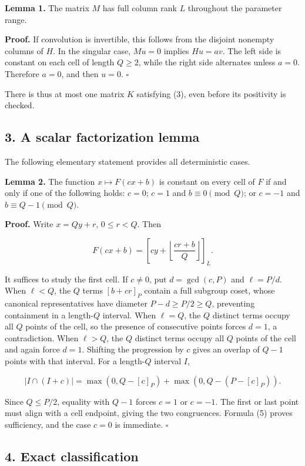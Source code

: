 \documentclass[
]{article}
\begin{document}
\textbf{Lemma 1.} The matrix \(M\) has full column rank \(L\) throughout
the parameter range.

\textbf{Proof.} If convolution is invertible, this follows from the
disjoint nonempty columns of \(H\). In the singular case, \(Mu=0\)
implies \(Hu=av\). The left side is constant on each cell of length
\(Q\ge2\), while the right side alternates unless \(a=0\). Therefore
\(a=0\), and then \(u=0\). \(\square\)

There is thus at most one matrix \(K\) satisfying (3), even before its
positivity is checked.

\subsection{3. A scalar factorization
lemma}\label{a-scalar-factorization-lemma}

The following elementary statement provides all deterministic cases.

\textbf{Lemma 2.} The function \(x\mapsto F(cx+b)\) is constant on every
cell of \(F\) if and only if one of the following holds: \(c=0\);
\(c=1\) and \(b\equiv0\pmod Q\); or \(c=-1\) and \(b\equiv Q-1\pmod Q\).

\textbf{Proof.} Write \(x=Qy+r\), \(0\le r<Q\). Then

\[
F(cx+b)=\left[cy+\left\lfloor\frac{cr+b}{Q}\right\rfloor\right]_L.
\tag{5}
\]

It suffices to study the first cell. If \(c\ne0\), put \(d=\gcd(c,P)\)
and \(\ell=P/d\). When \(\ell<Q\), the \(Q\) terms \([b+cr]_P\) contain
a full subgroup coset, whose canonical representatives have diameter
\(P-d\ge P/2\ge Q\), preventing containment in a length-\(Q\) interval.
When \(\ell=Q\), the \(Q\) distinct terms occupy all \(Q\) points of the
cell, so the presence of consecutive points forces \(d=1\), a
contradiction. When \(\ell>Q\), the \(Q\) distinct terms occupy all
\(Q\) points of the cell and again force \(d=1\). Shifting the
progression by \(c\) gives an overlap of \(Q-1\) points with that
interval. For a length-\(Q\) interval \(I\),

\[
|I\cap(I+c)|=\max(0,Q-[c]_P)+\max(0,Q-(P-[c]_P)).
\]

Since \(Q\le P/2\), equality with \(Q-1\) forces \(c=1\) or \(c=-1\).
The first or last point must align with a cell endpoint, giving the two
congruences. Formula (5) proves sufficiency, and the case \(c=0\) is
immediate. \(\square\)

\subsection{4. Exact classification}\label{exact-classification}
\end{document}
